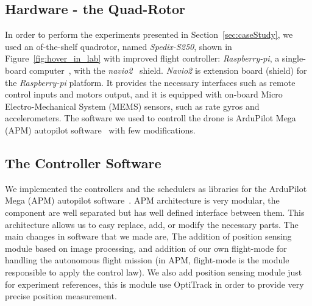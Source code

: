 \documentclass[ twoside, 12pt ]{article}
\begin{document}
\subsection{Hardware - the Quad-Rotor}
\label{sec:Experiment setup-HW}

In order to perform the experiments presented in Section~\ref{sec:caseStudy}, we used an of-the-shelf quadrotor, named \textit{Spedix-S250}, shown in Figure~\ref{fig:hover_in_lab} with improved flight controller: \textit{Raspberry-pi}, a single-board computer~\cite{raspberry}, with the \textit{navio2}~\cite{navio} shield.
\textit{Navio2} is extension board (shield) for the \textit{Raspberry-pi} platform. It provides the necessary interfaces such as remote control inputs and motors output, and it is equipped with on-board Micro Electro-Mechanical System (MEMS) sensors, such as rate gyros and accelerometers.
The software we used to controll the drone is ArduPilot Mega (APM) autopilot software~\cite{APM} with few modifications.


\subsection{The Controller Software}
We implemented the controllers and the schedulers as libraries for the ArduPilot Mega (APM) autopilot software~\cite{APM}.
APM architecture is very modular, the component are well separated but has well defined interface between them. This architecture allows us to easy replace, add, or modify the necessary parts.
The main changes in software that we made are, The addition of position sensing module based on image processing, and addition of our own flight-mode for handling the autonomous flight mission (in APM, flight-mode is the module responsible to apply the control law).
We also add position sensing module just for experiment references, this is module use OptiTrack in order to provide very precise position measurement. 
\end{document}
